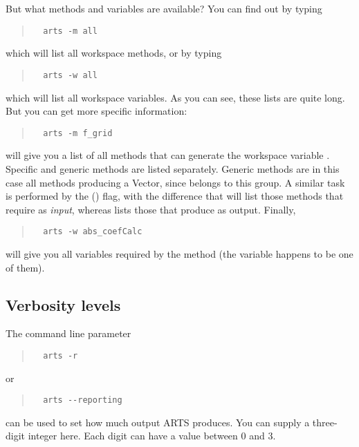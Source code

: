 But what methods and variables are available? You can find out by
typing
\begin{quote}
\begin{verbatim}
  arts -m all
\end{verbatim}
\end{quote}
which will list all workspace methods, or by typing 
\begin{quote}
\begin{verbatim}
  arts -w all
\end{verbatim}
\end{quote}
which will list all workspace variables. As you can see, these lists
are quite long. But you can get more specific information:
\begin{quote}
\begin{verbatim}
  arts -m f_grid
\end{verbatim}
\end{quote}
will give you a list of all methods that can generate the workspace
variable . Specific and generic methods are listed
separately. Generic methods are in this case all methods producing a
Vector, since  belongs to this group. A similar task is
performed by the  () flag, with the difference
that  will list those methods that require
 as \emph{input}, whereas  lists
those that produce  as output. Finally,
\begin{quote}
\begin{verbatim}
  arts -w abs_coefCalc
\end{verbatim}
\end{quote}
will give you all variables required by the method 
(the variable  happens to be one of them).



\subsection*{Verbosity levels}

The command line parameter 
\begin{quote}
\begin{verbatim}
  arts -r
\end{verbatim}
\end{quote}
or
\begin{quote}
\begin{verbatim}
  arts --reporting
\end{verbatim}
\end{quote}
can be used to set how much output ARTS produces. You can supply a
three-digit integer here. Each digit can have a value between 0 and 3.

